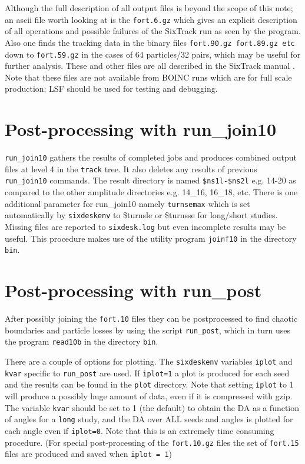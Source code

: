 \documentclass{cernatsnote}    %
\begin{document}
Although the full description of all output files is beyond the scope
of this note; an ascii file worth
looking at is the {\tt fort.6.gz} which gives an explicit description of
all operations and possible failures of the SixTrack run as seen by
the program. Also one finds the tracking data in the
binary files {\tt fort.90.gz fort.89.gz etc} down to {\tt fort.59.gz}
in the cases of 64 particles/32 pairs, 
which may be useful for further
analysis. These and other files are all described in the
SixTrack manual \cite{SixTrack}. Note that these files are not available
from BOINC runs which are for full scale production; LSF should be used
for testing and debugging. 

\section{Post-processing with run\_join10}
{\tt run\_join10} gathers the results of completed jobs and
produces combined output files at level 4 in the {\tt track} tree. 
It also deletes any results of previous {\tt run\_join10} commands.
The result directory is named {\tt \$ns1l-\$ns2l} e.g. 14-20 as compared to the
other amplitude directories e.g. 14\_16, 16\_18, etc.
There is one additional parameter for run\_join10 namely
{\tt turnsemax} which is set automatically by {\tt sixdeskenv} 
to \$turnsle or \$turnsse
for long/short studies. Missing files are reported to {\tt sixdesk.log}
but even incomplete results may be useful. This procedure makes use
of the utility program {\tt joinf10} in the directory {\tt bin}.

\section{Post-processing with run\_post}
%
\label{sec:run_post}
After possibly joining the {\tt fort.10} files they can be
postprocessed to find chaotic boundaries and particle losses by using
the script {\tt run\_post}, which in turn uses the program {\tt read10b}
in the directory {\tt bin}.  

There are a couple of options for plotting.
The  {\tt sixdeskenv} variables {\tt iplot} and {\tt kvar} specific to {\tt run\_post} are used.
If {\tt iplot=1} a plot is produced for each seed and the results
can be found in the {\tt plot} directory. Note that setting 
{\tt iplot} to 1 will produce a
possibly huge amount of data, even if it is compressed with gzip.
The variable {\tt kvar} should be set to 1 (the default) to 
obtain the DA as a function of angles for a {\tt long} study,
and the DA over ALL seeds and angles is plotted for each angle
even if {\tt iplot=0}. Note that this is an extremely time consuming
procedure. (For special post-processing of the 
{\tt fort.10.gz} files the set of {\tt fort.15} files are
produced and saved when {\tt iplot = 1})
\end{document}
